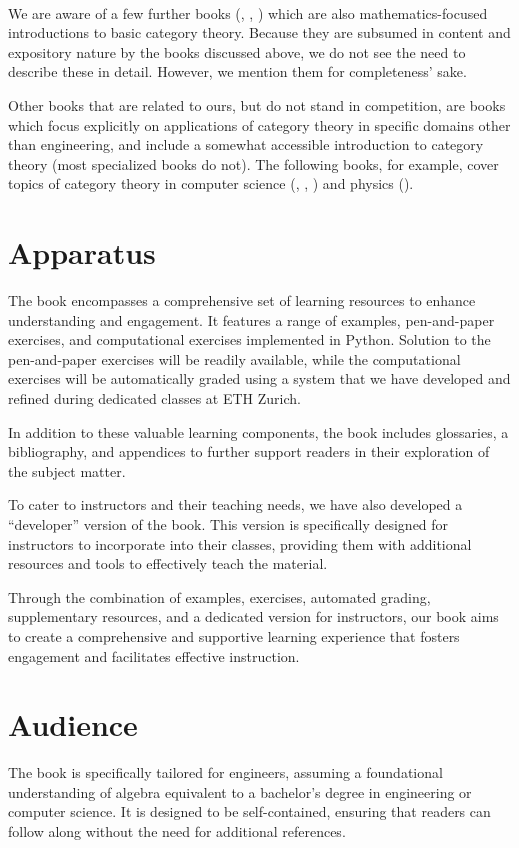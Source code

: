 \documentclass[10pt, article, one side]{memoir}
\begin{document}
    \

    We are aware of a few further books (\cite{Grandis}, \cite{Roman}, \cite{Simmons}) which are also mathematics-focused introductions to basic category theory.
    Because they are subsumed in content and expository nature by the books discussed above, we do not see the need to describe these in detail.
    However, we mention them for completeness' sake.

    Other books that are related to ours, but do not stand in competition, are books which focus explicitly on applications of category theory in specific domains other than engineering, and include a somewhat accessible introduction to category theory (most specialized books do not).
    The following books, for example, cover topics of category theory in computer science (\cite{BarrWells},  \cite{Milewski}, \cite{Pierce}) and physics (\cite{CoeckeKisssinger}).

    \section{Apparatus}
    The book encompasses a comprehensive set of learning resources to enhance understanding and engagement.
    It features a range of examples, pen-and-paper exercises, and computational exercises implemented in Python.
    Solution to the pen-and-paper exercises will be readily available, while the computational exercises will be automatically graded using a system that we have developed and refined during dedicated classes at ETH Zurich.

    In addition to these valuable learning components, the book includes glossaries, a bibliography, and appendices to further support readers in their exploration of the subject matter.

    To cater to instructors and their teaching needs, we have also developed a ``developer'' version of the book.
    This version is specifically designed for instructors to incorporate into their classes, providing them with additional resources and tools to effectively teach the material.

    Through the combination of examples, exercises, automated grading, supplementary resources, and a dedicated version for instructors, our book aims to create a comprehensive and supportive learning experience that fosters engagement and facilitates effective instruction.

    \section{Audience}
    The book is specifically tailored for engineers, assuming a foundational understanding of algebra equivalent to a bachelor's degree in engineering or computer science.
    It is designed to be self-contained, ensuring that readers can follow along without the need for additional references.
\end{document}
